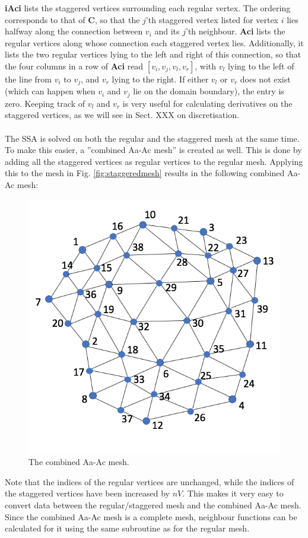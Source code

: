 \documentclass{article}
\begin{document}
\textbf{iAci} lists the staggered vertices surrounding each regular vertex. The ordering corresponds to that of \textbf{C}, so that the $j$'th staggered vertex listed for vertex $i$ lies halfway along the connection between $v_i$ and its $j$'th neighbour. \textbf{Aci} lists the regular vertices along whose connection each staggered vertex lies. Additionally, it lists the two regular vertices lying to the left and right of this connection, so that the four columns in a row of \textbf{Aci} read $[v_i,v_j,v_l,v_r]$, with $v_l$ lying to the left of the line from $v_i$ to $v_j$, and $v_r$ lying to the right. If either $v_l$ or $v_r$ does not exist (which can happen when $v_i$ and $v_j$ lie on the domain boundary), the entry is zero. Keeping track of $v_l$ and $v_r$ is very useful for calculating derivatives on the staggered vertices, as we will see in Sect. XXX on discretisation.\\
\\
The SSA is solved on both the regular and the staggered mesh at the same time. To make this easier, a ''combined Aa-Ac mesh'' is created as well. This is done by adding all the staggered vertices as regular vertices to the regular mesh. Applying this to the mesh in Fig. \ref{fig:staggeredmesh} results in the following combined Aa-Ac mesh:

\begin{figure}[H] \label{fig:combinedAaAcmesh}
  \includegraphics[width=0.5\linewidth]{Fig_AaAcMesh.png}
  \caption{The combined Aa-Ac mesh.}
\end{figure}

Note that the indices of the regular vertices are unchanged, while the indices of the staggered vertices have been increased by $nV$. This makes it very easy to convert data between the regular/staggered mesh and the combined Aa-Ac mesh. Since the combined Aa-Ac mesh is a complete mesh, neighbour functions can be calculated for it using the same subroutine as for the regular mesh.
\end{document}
